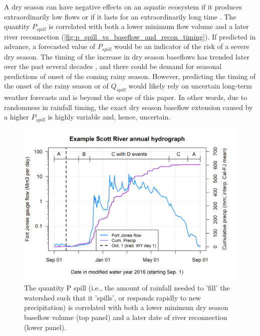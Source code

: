 \documentclass[hess, manuscript]{copernicus}
\begin{document}
A dry season can have negative effects on an aquatic ecosystem if it
produces extraordinarily low flows or if it lasts for an extraordinarily
long time \citeyearpar[e.g., delayed salmon habitat access documented in
CDFW][]{CDFW2015a}. The quantity \(P_{spill}\) is correlated with both a
lower minimum flow volume and a later river reconnection
(\autoref{fig:p_spill_vs_baseflow_and_recon_timing}). If predicted in
advance, a forecasted value of \(P_{spill}\) would be an indicator of
the risk of a severe dry season. The timing of the increase in dry
season baseflows has trended later over the past several decades
\citeyearpar[see Siskiyou County][and Chapter 1 of this
dissertation]{SiskiyouCounty2021}, and there could be demand for
seasonal predictions of onset of the coming rainy season. However,
predicting the timing of the onset of the rainy season or of
\(Q_{spill}\) would likely rely on uncertain long-term weather forecasts
and is beyond the scope of this paper. In other words, due to randomness
in rainfall timing, the exact dry season baseflow extension caused by a
higher \(P_{spill}\) is highly variable and, hence, uncertain.

\begin{figure}
\includegraphics[width=1\linewidth]{f02} \caption{\label{fig:p_spill_vs_baseflow_and_recon_timing} The quantity P spill (i.e., the amount of rainfall needed to 'fill' the watershed such that it 'spills', or responds rapidly to new precipitation) is correlated with both a lower minimum dry season baseflow volume (top panel) and a later date of river reconnection (lower panel).}\label{fig:p_spill_vs_baseflow_and_recon_timing}
\end{figure}
\end{document}
